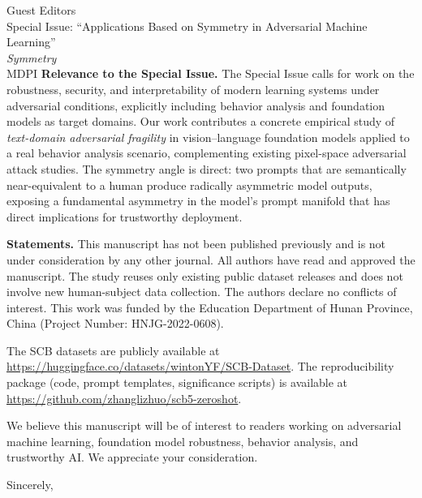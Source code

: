 \documentclass[11pt]{letter}
\begin{document}
\begin{letter}{Guest Editors \\ Special Issue: ``Applications Based on Symmetry in Adversarial Machine Learning'' \\ \textit{Symmetry} \\ MDPI}
\textbf{Relevance to the Special Issue.}
The Special Issue calls for work on the robustness, security, and interpretability of modern learning systems under adversarial conditions, explicitly including behavior analysis and foundation models as target domains. Our work contributes a concrete empirical study of \emph{text-domain adversarial fragility} in vision--language foundation models applied to a real behavior analysis scenario, complementing existing pixel-space adversarial attack studies. The symmetry angle is direct: two prompts that are semantically near-equivalent to a human produce radically asymmetric model outputs, exposing a fundamental asymmetry in the model's prompt manifold that has direct implications for trustworthy deployment.

\textbf{Statements.}
This manuscript has not been published previously and is not under consideration by any other journal. All authors have read and approved the manuscript. The study reuses only existing public dataset releases and does not involve new human-subject data collection. The authors declare no conflicts of interest. This work was funded by the Education Department of Hunan Province, China (Project Number: HNJG-2022-0608).

The SCB datasets are publicly available at \url{https://huggingface.co/datasets/wintonYF/SCB-Dataset}. The reproducibility package (code, prompt templates, significance scripts) is available at \url{https://github.com/zhanglizhuo/scb5-zeroshot}.

We believe this manuscript will be of interest to readers working on adversarial machine learning, foundation model robustness, behavior analysis, and trustworthy AI. We appreciate your consideration.

\closing{Sincerely,}

\end{letter}
\end{document}
